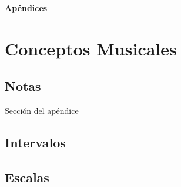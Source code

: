 \documentclass[12pt,twoside,titlepage]{report}
\begin{document}
\appendix
{}
{}
\mbox{}
\vfill
\begin{center}
\begin{Huge}
\textbf{Apéndices}
\end{Huge}
\end{center}
\vfill
\mbox{}
\thispagestyle{empty}
\newpage
\mbox{}
\thispagestyle{empty}
\newpage

\chapter{Conceptos Musicales}
\label{sec:apendice}

\section{Notas}

Sección del apéndice

\section{Intervalos}
\section{Escalas}






\end{document}
